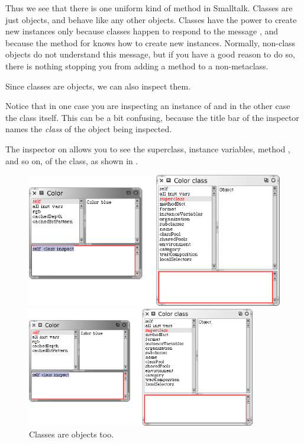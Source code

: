 \documentclass[a4paper,10pt,twoside]{book}
\begin{document}
Thus we see that there is one uniform kind of method  in Smalltalk. Classes are just objects, and behave like any other objects. 
Classes have the power to create new instances only because classes happen to respond to the message , and because the method for  knows how to create new instances.
Normally, non-class objects do not understand this message, but if you have a good reason to do so, there is nothing stopping you from adding a  method to a non-metaclass.

Since classes are objects, we can also inspect them.


\noindent
Notice that in one case you are inspecting an instance of  and in the other case the  class itself.  
This can be a bit confusing, because the title bar of the inspector names the \emph{class} of the object being inspected.

The inspector on  allows you to see the superclass, instance variables, method , and so on, of the  class, as shown in .

\begin{center}
\begin{figure}[!ht]
\ifluluelse
	{\centerline{\includegraphics[width=\textwidth]{InspectingColor}}}
	{\centerline{\includegraphics[width=10cm]{InspectingColor}}}
\caption{Classes are objects too.\label{fig:inspectingColor}}
\end{figure}
\end{center}
\end{document}
